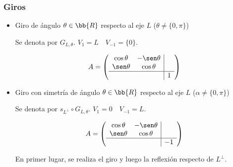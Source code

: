 \subsubsection{Giros}
\begin{itemize}
    \item  Giro de ángulo $\theta \in \bb{R}$ respecto al eje $L$ ($\theta\neq \{0,\pi\}$)

    Se denota por $G_{L,\theta}$. $V_1=L\quad V_{-1}=\{0\}$.

    \begin{equation*}
        A = \left(\begin{array}{cc|c}
            \cos \theta & -\sen \theta & \\
            \sen \theta & \cos \theta & \\ \hline
            && 1
        \end{array}\right)
    \end{equation*}

    \item  Giro con simetría de ángulo $\theta \in \bb{R}$ respecto al eje $L$ ($\alpha \neq \{0,\pi\}$)

    Se denota por $s_{L^\perp} \circ G_{L,\theta}$.  $V_1=0\quad V_{-1}=L$.

    \begin{equation*}
        A = \left(\begin{array}{cc|c}
            \cos \theta & -\sen \theta & \\
            \sen \theta & \cos \theta & \\ \hline
            && -1
        \end{array}\right)
    \end{equation*}

    En primer lugar, se realiza el giro y luego la reflexión respecto de $L^\perp$.
    
\end{itemize}

